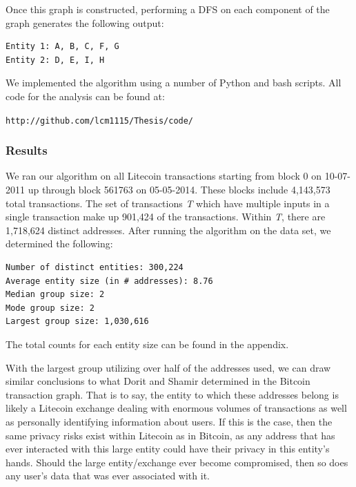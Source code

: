 \documentclass[11pt]{article}
\begin{document}
\begin{center}
\end{center}

Once this graph is constructed, performing a DFS on each component of the graph generates the following output:
\begin{verbatim}
Entity 1: A, B, C, F, G
Entity 2: D, E, I, H
\end{verbatim}

We implemented the algorithm using a number of Python and bash scripts. All code for the analysis can be found at:
    \begin{center} \texttt{http://github.com/lcm1115/Thesis/code/} \end{center}

\subsubsection{Results}
We ran our algorithm on all Litecoin transactions starting from block 0 on 10-07-2011 up through block 561763 on
05-05-2014. These blocks include 4,143,573 total transactions. The set of transactions \emph{T} which have multiple
inputs in a single transaction make up 901,424 of the transactions. Within \emph{T}, there are 1,718,624 distinct
addresses. After running the algorithm on the data set, we determined the following:
\begin{verbatim}
Number of distinct entities: 300,224
Average entity size (in # addresses): 8.76
Median group size: 2
Mode group size: 2
Largest group size: 1,030,616
\end{verbatim}

The total counts for each entity size can be found in the appendix.

With the largest group utilizing over half of the addresses used, we can draw similar conclusions to what Dorit and
Shamir determined in the Bitcoin transaction graph. That is to say, the entity to which these addresses belong is likely
a Litecoin exchange dealing with enormous volumes of transactions as well as personally identifying information about
users\cite{ron13}. If this is the case, then the same privacy risks exist within Litecoin as in Bitcoin, as any address
that has ever interacted with this large entity could have their privacy in this entity's hands.  Should the large
entity/exchange ever become compromised, then so does any user's data that was ever associated with it.
\end{document}
